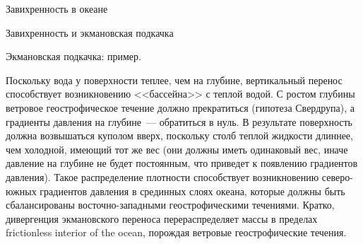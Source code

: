 \begin{chapter}{Завихренность в океане}
\begin{section}{Завихренность и экмановская подкачка}
\begin{paragraph}{Экмановская подкачка: пример.}

Поскольку вода у поверхности теплее, чем на глубине, вертикальный
перенос способствует возникновению <<бассейна>> с теплой водой. С ростом
глубины ветровое геострофическое течение должно прекратиться
(гипотеза Свердрупа), а градиенты давления на глубине~--- обратиться в нуль.
В результате поверхность должна возвышаться куполом вверх,
поскольку столб теплой жидкости длиннее, чем холодной, имеющий тот же вес 
(они должны иметь одинаковый вес, иначе давление на
глубине не будет постоянным, что приведет к появлению градиентов
давления). Такое распределение плотности способствует возникновению
северо-южных градиентов давления в срединных слоях океана, которые
должны быть сбалансированы восточно-западными геострофическими
течениями. Кратко, дивергенция экмановского переноса
перераспределяет массы в пределах frictionless interior of the ocean, 
порождая ветровые геострофические течения.
%


\end{paragraph}
\end{section}
\end{chapter}
